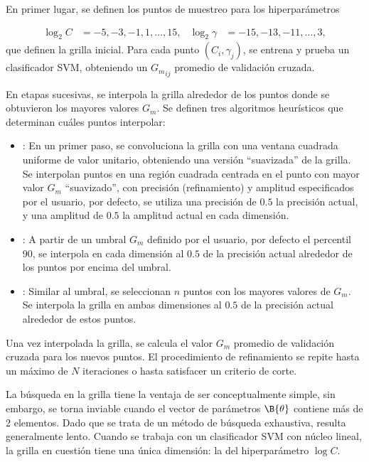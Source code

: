 En primer lugar, se definen los puntos de muestreo para los
hiperparámetros

\begin{align*}
  \log_2 C &= -5, -3, -1, 1, \ldots, 15, & \log_2\gamma &= -15,-13,
  -11, \ldots,3,
\end{align*}
que definen la grilla inicial. Para cada punto $(C_i,\gamma_j)$, se
entrena y prueba un clasificador SVM, obteniendo un ${G_m}_{ij}$
promedio de validación cruzada.

En etapas sucesivas, se interpola la grilla alrededor de los puntos
donde se obtuvieron los mayores valores $G_m$. Se definen tres algoritmos
heurísticos que determinan cuáles puntos interpolar:

\begin{itemize}
\item {}: En un primer paso, se convoluciona la grilla con una
  ventana cuadrada uniforme de valor unitario, obteniendo una versión
  ``suavizada'' de la grilla. Se interpolan puntos en una región
  cuadrada centrada en el punto con mayor valor $G_m$ ``suavizado'',
  con precisión (refinamiento) y amplitud especificados por el
  usuario, por defecto, se utiliza una precisión de $0.5$ la precisión
  actual, y una amplitud de $0.5$ la amplitud actual en cada
  dimensión.
\item {}: A partir de un umbral $G_m$ definido por el usuario,
  por defecto el percentil 90, se interpola en cada dimensión al $0.5$
  de la precisión actual alrededor de los puntos por encima del
  umbral.
\item {}: Similar al umbral, se seleccionan $n$ puntos
  con los mayores valores de $G_m$. Se interpola la grilla en ambas
  dimensiones al $0.5$ de la precisión actual alrededor de estos
  puntos.
\end{itemize}
Una vez interpolada la grilla, se calcula el valor $G_m$ promedio de
validación cruzada para los nuevos puntos. El procedimiento de
refinamiento se repite hasta un máximo de $N$ iteraciones o hasta
satisfacer un criterio de corte.

La búsqueda en la grilla tiene la ventaja de ser conceptualmente
simple, sin embargo, se torna inviable cuando el vector de parámetros
$\B{\theta}$ contiene más de 2 elementos. Dado que se trata de un
método de búsqueda exhaustiva, resulta generalmente lento.  Cuando se
trabaja con un clasificador SVM con núcleo lineal, la grilla en
cuestión tiene una única dimensión: la del hiperparámetro $\log C$.
